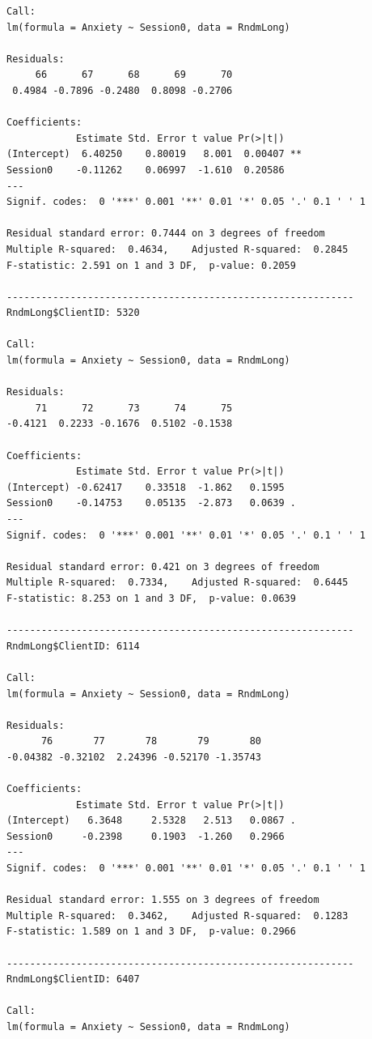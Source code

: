 \documentclass[
  11pt,
]{book}
\begin{document}
\begin{verbatim}
Call:
lm(formula = Anxiety ~ Session0, data = RndmLong)

Residuals:
     66      67      68      69      70 
 0.4984 -0.7896 -0.2480  0.8098 -0.2706 

Coefficients:
            Estimate Std. Error t value Pr(>|t|)   
(Intercept)  6.40250    0.80019   8.001  0.00407 **
Session0    -0.11262    0.06997  -1.610  0.20586   
---
Signif. codes:  0 '***' 0.001 '**' 0.01 '*' 0.05 '.' 0.1 ' ' 1

Residual standard error: 0.7444 on 3 degrees of freedom
Multiple R-squared:  0.4634,    Adjusted R-squared:  0.2845 
F-statistic: 2.591 on 1 and 3 DF,  p-value: 0.2059

------------------------------------------------------------ 
RndmLong$ClientID: 5320

Call:
lm(formula = Anxiety ~ Session0, data = RndmLong)

Residuals:
     71      72      73      74      75 
-0.4121  0.2233 -0.1676  0.5102 -0.1538 

Coefficients:
            Estimate Std. Error t value Pr(>|t|)  
(Intercept) -0.62417    0.33518  -1.862   0.1595  
Session0    -0.14753    0.05135  -2.873   0.0639 .
---
Signif. codes:  0 '***' 0.001 '**' 0.01 '*' 0.05 '.' 0.1 ' ' 1

Residual standard error: 0.421 on 3 degrees of freedom
Multiple R-squared:  0.7334,    Adjusted R-squared:  0.6445 
F-statistic: 8.253 on 1 and 3 DF,  p-value: 0.0639

------------------------------------------------------------ 
RndmLong$ClientID: 6114

Call:
lm(formula = Anxiety ~ Session0, data = RndmLong)

Residuals:
      76       77       78       79       80 
-0.04382 -0.32102  2.24396 -0.52170 -1.35743 

Coefficients:
            Estimate Std. Error t value Pr(>|t|)  
(Intercept)   6.3648     2.5328   2.513   0.0867 .
Session0     -0.2398     0.1903  -1.260   0.2966  
---
Signif. codes:  0 '***' 0.001 '**' 0.01 '*' 0.05 '.' 0.1 ' ' 1

Residual standard error: 1.555 on 3 degrees of freedom
Multiple R-squared:  0.3462,    Adjusted R-squared:  0.1283 
F-statistic: 1.589 on 1 and 3 DF,  p-value: 0.2966

------------------------------------------------------------ 
RndmLong$ClientID: 6407

Call:
lm(formula = Anxiety ~ Session0, data = RndmLong)


\end{verbatim}
\end{document}
